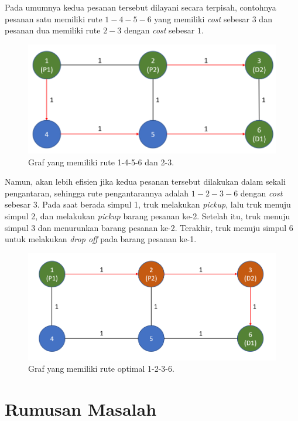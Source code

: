 Pada umumnya kedua pesanan tersebut dilayani secara terpisah, contohnya pesanan satu memiliki rute $1-4-5-6$
yang memiliki \textit{cost} sebesar $3$ dan pesanan dua memiliki rute $2-3$ dengan \textit{cost} sebesar $1$.

\begin{figure}[h]
    \centering
    \includegraphics[width=1.0\textwidth]{resources/graph_routes.png}
    \caption{Graf yang memiliki rute 1-4-5-6 dan 2-3.}
\end{figure}

Namun, akan lebih efisien jika kedua pesanan tersebut dilakukan dalam sekali pengantaran, sehingga rute pengantarannya adalah $1-2-3-6$ dengan \textit{cost} sebesar $3$.
Pada saat berada simpul 1, truk melakukan \textit{pickup}, lalu truk menuju simpul 2, dan melakukan \textit{pickup} barang pesanan ke-2. Setelah itu, truk menuju simpul 3
dan menurunkan barang pesanan ke-2. Terakhir, truk menuju simpul 6  untuk melakukan \textit{drop off} pada barang pesanan ke-1.

\begin{figure}[h]
    \centering
    \includegraphics[width=1.0\textwidth]{resources/graph_optimal.png}
    \caption{Graf yang memiliki rute optimal 1-2-3-6.}
\end{figure}

\section{Rumusan Masalah}

